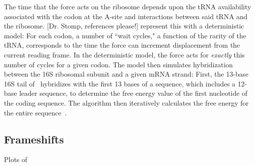 \documentclass[12pt]{article}
\begin{document}
The time that the force acts on the ribosome depends upon
the tRNA availability associated with the codon at the A-site 
and interactions between said tRNA and the ribosome. [Dr. Stomp, references please!]
\citeauthor{lalit:mechanics} represent this with a deterministic model: For each codon,
a number of ``wait cycles," a function of the rarity of the
tRNA, corresponds to the time the force can
increment displacement from the current reading frame.  In the
deterministic model, the force acts for \emph{exactly} this number
of cycles for a given codon. The model then
simulates hybridization between the
16S ribosomal subunit and a given mRNA strand: First, the 13-base 16S
tail of \ecoli\ hybridizes with the first 13 bases of a sequence,
which includes a 12-base leader sequence, to determine the free energy 
value of the first nucleotide of the coding sequence. The algorithm then iteratively calculates
the free energy for the entire sequence~\cite{starmer}.

\subsection{Frameshifts}
\label{section:frameshifts}

\begin{cfigure}
  \caption{Plots of~\prfB}
  \label{prfB:detplots}
\end{cfigure}
\end{document}
